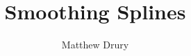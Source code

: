 \documentclass{beamer}
\title{Smoothing Splines}
\author{Matthew Drury}
\begin{document}
%
\begin{frame}
  \titlepage
\end{frame}
%

%
\end{document}
